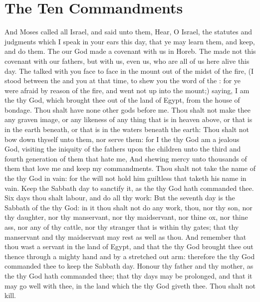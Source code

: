 \section*{The Ten Commandments}
\begin{biblechapter} %
\verse And Moses called all Israel, and said unto them, Hear, O Israel, the statutes and judgments which I speak in your ears this day, that ye may learn them, and keep, and do them.
\verse The \LORD our God made a covenant with us in Horeb.
\verse The \LORD made not this covenant with our fathers, but with us, even us, who are all of us here alive this day.
\verse The \LORD talked with you face to face in the mount out of the midst of the fire,
\verse (I stood between the \LORD and you at that time, to shew you the word of the \LORD: for ye were afraid by reason of the fire, and went not up into the mount;) saying,
\verse I am the \LORD thy God, which brought thee out of the land of Egypt, from the house of bondage.
\verse Thou shalt have none other gods before me.
\verse Thou shalt not make thee any graven image, or any likeness of any thing that is in heaven above, or that is in the earth beneath, or that is in the waters beneath the earth:
\verse Thou shalt not bow down thyself unto them, nor serve them: for I the \LORD thy God am a jealous God, visiting the iniquity of the fathers upon the children unto the third and fourth generation of them that hate me,
\verse And shewing mercy unto thousands of them that love me and keep my commandments.
\verse Thou shalt not take the name of the \LORD thy God in vain: for the \LORD will not hold him guiltless that taketh his name in vain.
\verse Keep the Sabbath day to sanctify it, as the \LORD thy God hath commanded thee.
\verse Six days thou shalt labour, and do all thy work:
\verse But the seventh day is the Sabbath of the \LORD thy God: in it thou shalt not do any work, thou, nor thy son, nor thy daughter, nor thy manservant, nor thy maidservant, nor thine ox, nor thine ass, nor any of thy cattle, nor thy stranger that is within thy gates; that thy manservant and thy maidservant may rest as well as thou.
\verse And remember that thou wast a servant in the land of Egypt, and that the \LORD thy God brought thee out thence through a mighty hand and by a stretched out arm: therefore the \LORD thy God commanded thee to keep the Sabbath day.
\verse Honour thy father and thy mother, as the \LORD thy God hath commanded thee; that thy days may be prolonged, and that it may go well with thee, in the land which the \LORD thy God giveth thee.
\verse Thou shalt not kill.

\end{biblechapter}
